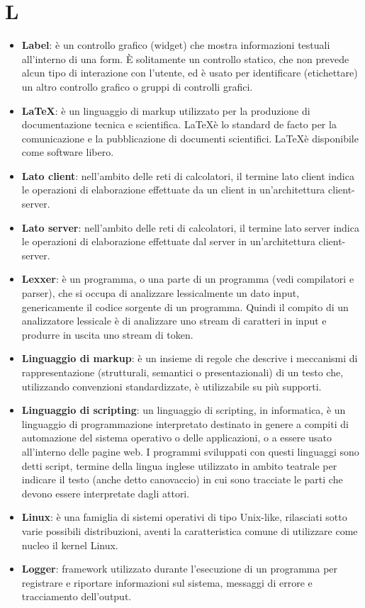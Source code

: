\section{L}
\begin{itemize}
	\item
	\textbf{Label}: è un controllo grafico (widget) che mostra informazioni testuali all'interno di una form. È solitamente un controllo statico, che non prevede alcun tipo di interazione con l'utente, ed è usato per identificare (etichettare) un altro controllo grafico o gruppi di controlli grafici. 
	\item
	\textbf{\LaTeX}: è un linguaggio di markup utilizzato per la produzione di documentazione tecnica e scientifica. \LaTeX è lo standard de facto per la comunicazione e la pubblicazione di documenti scientifici. \LaTeX è disponibile come software libero.
	\item
	\textbf{Lato client}: nell'ambito delle reti di calcolatori, il termine lato client indica le operazioni di elaborazione effettuate da un client in un'architettura client-server.
	\item
	\textbf{Lato server}: nell'ambito delle reti di calcolatori, il termine lato server indica le operazioni di elaborazione effettuate dal server in un'architettura client-server.
	\item
	\textbf{Lexxer}: è un programma, o una parte di un programma (vedi compilatori e parser), che si occupa di analizzare lessicalmente un dato input, genericamente il codice sorgente di un programma. Quindi il compito di un analizzatore lessicale è di analizzare uno stream di caratteri in input e produrre in uscita uno stream di token.
	\item
	\textbf{Linguaggio di markup}: è un insieme di regole che descrive i meccanismi di rappresentazione (strutturali, semantici o presentazionali) di un testo che, utilizzando convenzioni standardizzate, è utilizzabile su più supporti.
	\item
	\textbf{Linguaggio di scripting}: un linguaggio di scripting, in informatica, è un linguaggio di programmazione interpretato destinato in genere a compiti di automazione del sistema operativo o delle applicazioni, o a essere usato all'interno delle pagine web.
	I programmi sviluppati con questi linguaggi sono detti script, termine della lingua inglese utilizzato in ambito teatrale per indicare il testo (anche detto canovaccio) in cui sono tracciate le parti che devono essere interpretate dagli attori.
	\item
	\textbf{Linux}: è una famiglia di sistemi operativi di tipo Unix-like, rilasciati sotto varie possibili distribuzioni, aventi la caratteristica comune di utilizzare come nucleo il kernel Linux.
	\item
	\textbf{Logger}: framework utilizzato durante l'esecuzione di un programma per registrare e riportare informazioni sul sistema, messaggi di errore e tracciamento dell'output.
\end{itemize}